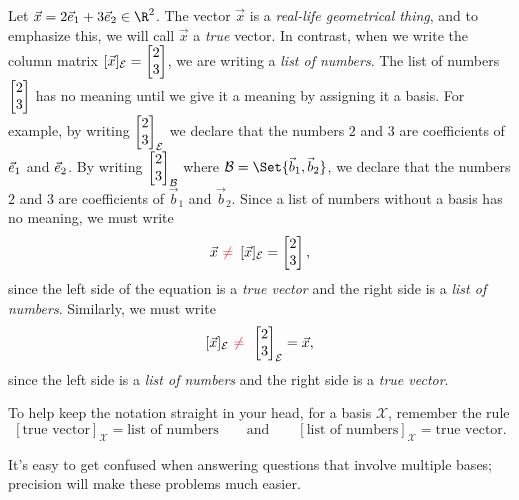 Let $\vec x=2\xhat+3\yhat\in \R^2$. The vector $\vec x$ is a \emph{real-life geometrical thing}, and to
emphasize this, we will call $\vec x$ a \emph{true} vector. In contrast, when we write
the column matrix $[\vec x]_{\mathcal E}=\mat{2\\3}$, we are writing a \emph{list of numbers}. The list of
numbers $\mat{2\\3}$ has no meaning until we give it a meaning by assigning it a basis. For example,
by writing $\mat{2\\3}_{\mathcal E}$ we declare that the numbers $2$ and $3$ are coefficients of ${\vec e_1}$ and
${\vec e_2}$. By writing $\mat{2\\3}_{\mathcal B}$ where $\mathcal B=\Set{\vec b_1,\vec b_2}$,
we declare that the numbers $2$ and $3$ are coefficients of $\vec b_1$ and $\vec b_2$. Since a list of numbers
without a basis has no meaning, we must write
\[
	\vec x\,\,{\color{Red}\neq}\,\,\, [\vec x]_{\mathcal E}=\mat{2\\3},
\]
since the left side of the equation is a \emph{true vector} and the right side is a \emph{list of numbers}. Similarly,
we must write
\[
	[\vec x]_{\mathcal E}\,\,{\color{Red}\neq}\,\,\, \mat{2\\3}_{\mathcal E}=\vec x,
\]
since the left side is a \emph{list of numbers} and the right side is a \emph{true vector}.

To help keep the notation straight in your head, for a basis $\mathcal X$, remember the rule
\[
	[\text{true vector}]_{\mathcal X} = \text{list of numbers}\qquad\text{and}\qquad
	[\text{list of numbers}]_{\mathcal X} =\text{true vector}.
\]

It's easy to get confused when answering questions that involve multiple bases; precision will
make these problems much easier.



